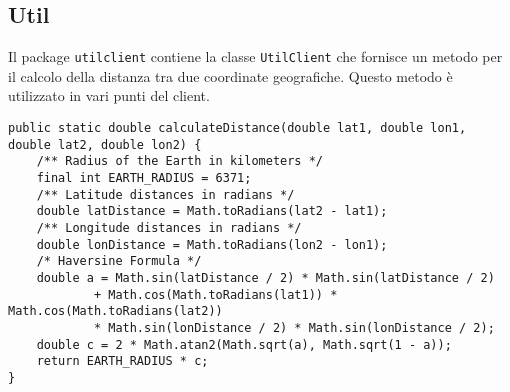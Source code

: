 \subsection{Util}
Il package \texttt{utilclient} contiene la classe \texttt{UtilClient}
che fornisce un metodo per il calcolo della distanza tra due coordinate
geografiche. 
Questo metodo è utilizzato in vari punti del client.

\begin{verbatim}
public static double calculateDistance(double lat1, double lon1, double lat2, double lon2) {
    /** Radius of the Earth in kilometers */
    final int EARTH_RADIUS = 6371;
    /** Latitude distances in radians */
    double latDistance = Math.toRadians(lat2 - lat1);
    /** Longitude distances in radians */
    double lonDistance = Math.toRadians(lon2 - lon1);
    /* Haversine Formula */
    double a = Math.sin(latDistance / 2) * Math.sin(latDistance / 2)
            + Math.cos(Math.toRadians(lat1)) * Math.cos(Math.toRadians(lat2))
            * Math.sin(lonDistance / 2) * Math.sin(lonDistance / 2);
    double c = 2 * Math.atan2(Math.sqrt(a), Math.sqrt(1 - a));
    return EARTH_RADIUS * c;
}
\end{verbatim}
